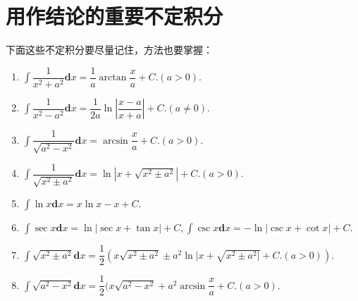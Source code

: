 \section{用作结论的重要不定积分}

\begin{proposition}
	下面这些不定积分要尽量记住，方法也要掌握：
	\begin{enumerate}
		\item $\displaystyle\int\dfrac{1}{x^2+a^2}\textbf{d}x = \dfrac{1}{a}\arctan{\dfrac{x}{a}+C.(a>0)}.$
		\item $\displaystyle\int\dfrac{1}{x^2-a^2}\textbf{d}x = \dfrac{1}{2a}\ln{\left|\dfrac{x-a}{x+a}\right|+C.(a\neq 0)}.$
		\item $\displaystyle\int\dfrac{1}{\sqrt{a^2-x^2}}\textbf{d}x = \arcsin{\dfrac{x}{a}}+C.(a>0).$
		\item $\displaystyle\int\dfrac{1}{\sqrt{x^2\pm a^2}}\textbf{d}x = \ln{\left|x+\sqrt{x^2\pm a^2}\right|}+C.(a>0).$
		\item $\displaystyle\int{\ln{x}}\textbf{d}x = x\ln{x}-x+C.$
		\item $\displaystyle\int\sec{x}\textbf{d}x = \ln{\left|\sec{x}+\tan{x}\right|}+C,\displaystyle\int\csc{x}\textbf{d}x=-\ln{\left|\csc{x}+\cot{x}\right|}+C.$
		\item $\displaystyle\int\sqrt{x^2\pm a^2}\textbf{d}x = \dfrac{1}{2}(x\sqrt{x^2\pm a^2}\pm a^2\ln{|x+\sqrt{x^2\pm a^2|}}+C.(a>0)).$
		\item $\displaystyle\int\sqrt{a^2-x^2}\textbf{d}x = \dfrac{1}{2}(x\sqrt{a^2-x^2}+a^2\arcsin{\dfrac{x}{a}}+C.(a>0).$
	\end{enumerate}	
\end{proposition}